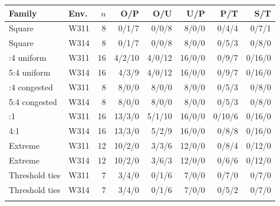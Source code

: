 \begin{tabular}{llrrrrrr}
\toprule
Family & Env. & $n$ & O/P & O/U & U/P & P/T & S/T \\
\midrule
Square & W311 & 8 & 0/1/7 & 0/0/8 & 8/0/0 & 0/4/4 & 0/7/1 \\
Square & W314 & 8 & 0/1/7 & 0/0/8 & 8/0/0 & 0/5/3 & 0/8/0 \\
\addlinespace
5:4 uniform & W311 & 16 & 4/2/10 & 4/0/12 & 16/0/0 & 0/9/7 & 0/16/0 \\
5:4 uniform & W314 & 16 & 4/3/9 & 4/0/12 & 16/0/0 & 0/9/7 & 0/16/0 \\
\addlinespace
5:4 congested & W311 & 8 & 8/0/0 & 8/0/0 & 8/0/0 & 0/5/3 & 0/8/0 \\
5:4 congested & W314 & 8 & 8/0/0 & 8/0/0 & 8/0/0 & 0/5/3 & 0/8/0 \\
\addlinespace
4:1 & W311 & 16 & 13/3/0 & 5/1/10 & 16/0/0 & 0/10/6 & 0/16/0 \\
4:1 & W314 & 16 & 13/3/0 & 5/2/9 & 16/0/0 & 0/8/8 & 0/16/0 \\
\addlinespace
Extreme & W311 & 12 & 10/2/0 & 3/3/6 & 12/0/0 & 0/8/4 & 0/12/0 \\
Extreme & W314 & 12 & 10/2/0 & 3/6/3 & 12/0/0 & 0/6/6 & 0/12/0 \\
\addlinespace
Threshold ties & W311 & 7 & 3/4/0 & 0/1/6 & 7/0/0 & 0/7/0 & 0/7/0 \\
Threshold ties & W314 & 7 & 3/4/0 & 0/1/6 & 7/0/0 & 0/5/2 & 0/7/0 \\
\addlinespace
\bottomrule
\end{tabular}
